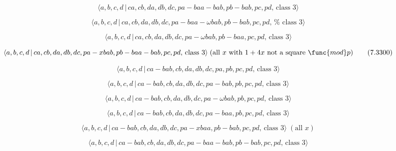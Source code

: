\documentclass[10pt]{article}
\begin{document}
\begin{equation}
\langle a,b,c,d\,|\,ca,cb,da,db,dc,pa-baa-bab,pb-bab,pc,pd,\,\text{class }%
3\rangle  \tag{7.3297}
\end{equation}

\begin{equation}
\langle a,b,c,d\,|\,ca,cb,da,db,dc,pa-baa-\omega bab,pb-bab,pc,pd,\,\text{%
class }3\rangle  \tag{7.3298}
\end{equation}

\begin{equation}
\langle a,b,c,d\,|\,ca,cb,da,db,dc,pa-\omega bab,pb-baa,pc,pd,\,\text{class }%
3\rangle  \tag{7.3299}
\end{equation}

\begin{equation}
\langle a,b,c,d\,|\,ca,cb,da,db,dc,pa-xbab,pb-baa-bab,pc,pd,\,\text{class }%
3\rangle \;(\text{all }x\text{ with }1+4x\text{ not a square }\func{mod}p) 
\tag{7.3300}
\end{equation}

\begin{equation}
\langle a,b,c,d\,|\,ca-bab,cb,da,db,dc,pa,pb,pc,pd,\,\text{class }3\rangle 
\tag{7.3301}
\end{equation}

\begin{equation}
\langle a,b,c,d\,|\,ca-bab,cb,da,db,dc,pa-bab,pb,pc,pd,\,\text{class }%
3\rangle  \tag{7.3302}
\end{equation}

\begin{equation}
\langle a,b,c,d\,|\,ca-bab,cb,da,db,dc,pa-\omega bab,pb,pc,pd,\,\text{class }%
3\rangle  \tag{7.3303}
\end{equation}

\begin{equation}
\langle a,b,c,d\,|\,ca-bab,cb,da,db,dc,pa-baa,pb,pc,pd,\,\text{class }%
3\rangle  \tag{7.3304}
\end{equation}

\begin{equation}
\langle a,b,c,d\,|\,ca-bab,cb,da,db,dc,pa-xbaa,pb-bab,pc,pd,\,\text{class }%
3\rangle \;(\text{all }x)  \tag{7.3305}
\end{equation}

\begin{equation}
\langle a,b,c,d\,|\,ca-bab,cb,da,db,dc,pa-baa-bab,pb-bab,pc,pd,\,\text{class 
}3\rangle  \tag{7.3306}
\end{equation}
\end{document}
